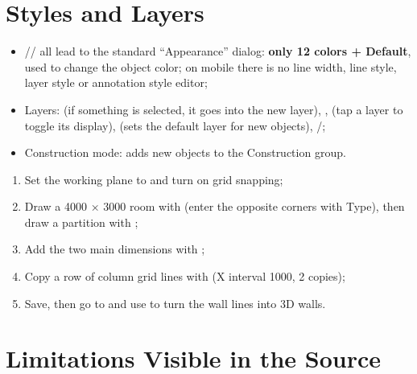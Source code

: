 \section{Styles and Layers}

\begin{itemize}
  \item {}// all lead to the
        standard ``Appearance'' dialog: \textbf{only 12 colors + Default}, used to change the object
        color; on mobile there is no line width, line style, layer style or annotation style editor;
  \item Layers:  (if something is selected, it goes into the new layer), ,
         (tap a layer to toggle its display),  (sets the default
        layer for new objects), /;
  \item Construction mode: adds new objects to the Construction group.
\end{itemize}

\begin{practice}
\begin{enumerate}
  \item Set the working plane to  and turn on grid snapping;
  \item Draw a 4000 × 3000 room with  (enter the opposite corners with Type), then
        draw a partition with ;
  \item Add the two main dimensions with ;
  \item Copy a row of column grid lines with  (X interval 1000, 2 copies);
  \item Save, then go to  and use  to turn the wall lines into 3D walls.
\end{enumerate}
\end{practice}

\section{Limitations Visible in the Source}

